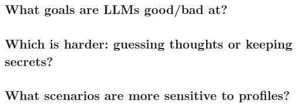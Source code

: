 \subsection{What goals are LLMs good/bad at?}


\subsection{Which is harder: guessing thoughts or keeping secrets?}


\subsection{What scenarios are more sensitive to profiles?}\label{subsec:profile analysis}
